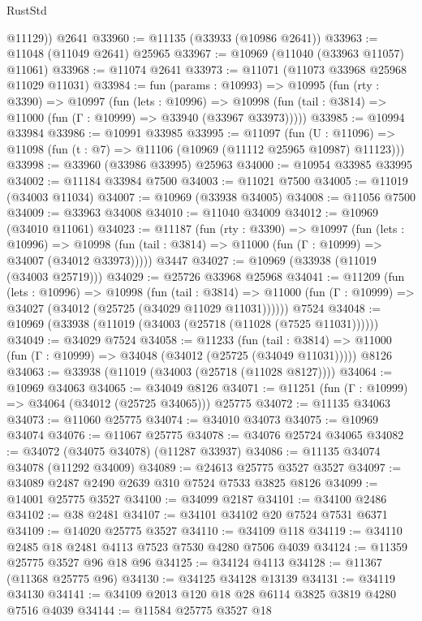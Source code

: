 \begin{lexlean}{RustStd}
\begin{coremodule}
        @11129))
    @2641
@33960 := @11135 (@33933 (@10986 @2641))
@33963 := @11048 (@11049 @2641) @25965
@33967 := @10969 (@11040 (@33963 @11057) @11061)
@33968 := @11074 @2641
@33973 := @11071 (@11073 @33968 @25968 @11029 @11031)
@33984 := fun (params : @10993) =>
  @10995
    (fun (rty : @3390) =>
    @10997
      (fun (lets : @10996) =>
      @10998 (fun (tail : @3814) => @11000 (fun (Γ : @10999) => @33940 (@33967 @33973)))))
@33985 := @10994 @33984
@33986 := @10991 @33985
@33995 := @11097
    (fun (U : @11096) => @11098 (fun (t : @7) => @11106 (@10969 (@11112 @25965 @10987) @11123)))
@33998 := @33960 (@33986 @33995) @25963
@34000 := @10954 @33985 @33995
@34002 := @11184 @33984 @7500
@34003 := @11021 @7500
@34005 := @11019 (@34003 @11034)
@34007 := @10969 (@33938 @34005)
@34008 := @11056 @7500
@34009 := @33963 @34008
@34010 := @11040 @34009
@34012 := @10969 (@34010 @11061)
@34023 := @11187
    (fun (rty : @3390) =>
    @10997
      (fun (lets : @10996) =>
      @10998 (fun (tail : @3814) => @11000 (fun (Γ : @10999) => @34007 (@34012 @33973)))))
    @3447
@34027 := @10969 (@33938 (@11019 (@34003 @25719)))
@34029 := @25726 @33968 @25968
@34041 := @11209
    (fun (lets : @10996) =>
    @10998
      (fun (tail : @3814) =>
      @11000 (fun (Γ : @10999) => @34027 (@34012 (@25725 (@34029 @11029 @11031))))))
    @7524
@34048 := @10969 (@33938 (@11019 (@34003 (@25718 (@11028 (@7525 @11031))))))
@34049 := @34029 @7524
@34058 := @11233
    (fun (tail : @3814) => @11000 (fun (Γ : @10999) => @34048 (@34012 (@25725 (@34049 @11031)))))
    @8126
@34063 := @33938 (@11019 (@34003 (@25718 (@11028 @8127))))
@34064 := @10969 @34063
@34065 := @34049 @8126
@34071 := @11251 (fun (Γ : @10999) => @34064 (@34012 (@25725 @34065))) @25775
@34072 := @11135 @34063
@34073 := @11060 @25775
@34074 := @34010 @34073
@34075 := @10969 @34074
@34076 := @11067 @25775
@34078 := @34076 @25724 @34065
@34082 := @34072 (@34075 @34078) (@11287 @33937)
@34086 := @11135 @34074 @34078 (@11292 @34009)
@34089 := @24613 @25775 @3527 @3527
@34097 := @34089 @2487 @2490 @2639 @310 @7524 @7533 @3825 @8126
@34099 := @14001 @25775 @3527
@34100 := @34099 @2187
@34101 := @34100 @2486
@34102 := @38 @2481
@34107 := @34101 @34102 @20 @7524 @7531 @6371
@34109 := @14020 @25775 @3527
@34110 := @34109 @118
@34119 := @34110 @2485 @18 @2481 @4113 @7523 @7530 @4280 @7506 @4039
@34124 := @11359 @25775 @3527 @96 @18 @96
@34125 := @34124 @4113
@34128 := @11367 (@11368 @25775 @96)
@34130 := @34125 @34128 @13139
@34131 := @34119 @34130
@34141 := @34109 @2013 @120 @18 @28 @6114 @3825 @3819 @4280 @7516 @4039
@34144 := @11584 @25775 @3527 @18

\end{coremodule}
\end{lexlean}
